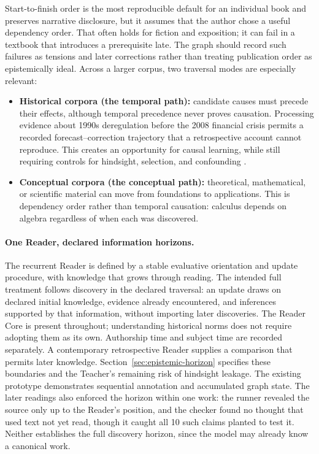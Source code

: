 \documentclass[11pt]{article}
\begin{document}
Start-to-finish order is the most reproducible default for an individual book
and preserves narrative disclosure, but it assumes that the author chose a
useful dependency order. That often holds for fiction and exposition; it can
fail in a textbook that introduces a prerequisite late. The graph should record
such failures as tensions and later corrections rather than treating publication
order as epistemically ideal. Across a larger corpus, two traversal modes are
especially relevant:

\begin{itemize}[leftmargin=*]
    \item \textbf{Historical corpora (the temporal path):} candidate causes
    must precede their effects, although temporal precedence never proves
    causation. Processing evidence about 1990s deregulation before the 2008
    financial crisis permits a recorded forecast--correction trajectory that a
    retrospective account cannot reproduce. This creates an opportunity for
    causal learning, while still requiring controls for hindsight, selection,
    and confounding \cite{westerberg2026thl}.
    \item \textbf{Conceptual corpora (the conceptual path):} theoretical,
    mathematical, or scientific material can move from foundations to
    applications. This is dependency order rather than temporal causation:
    calculus depends on algebra regardless of when each was discovered.
\end{itemize}

\paragraph{One Reader, declared information horizons.} The recurrent Reader is
defined by a stable evaluative orientation and update procedure, with knowledge
that grows through reading. The intended full treatment follows discovery in
the declared traversal: an update draws on declared initial knowledge, evidence
already encountered, and inferences supported by that information, without
importing later discoveries. The Reader Core is present throughout;
understanding historical norms does not require adopting them as its own.
Authorship time and subject time are recorded separately. A contemporary
retrospective Reader supplies a comparison that permits later knowledge.
Section~\ref{sec:epistemic-horizon} specifies these boundaries and the Teacher's
remaining risk of hindsight leakage. The existing prototype demonstrates
sequential annotation and accumulated graph state. The later readings also
enforced the horizon within one work: the runner revealed the source only up
to the Reader's position, and the checker found no thought that used text not
yet read, though it caught all 10 such claims planted to test it. Neither
establishes the full discovery horizon, since the model may
already know a canonical work.
\end{document}
